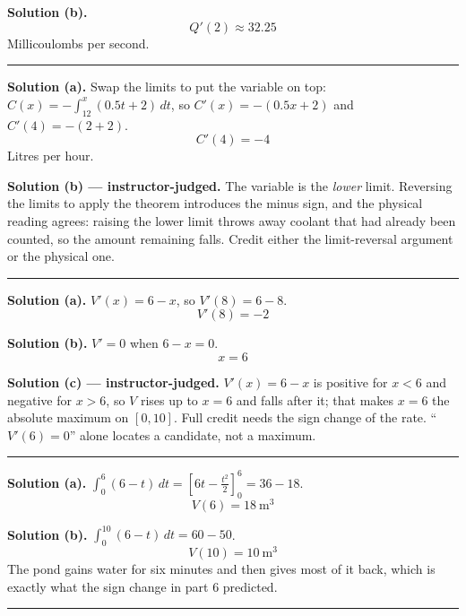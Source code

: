 \documentclass[12pt]{article}
\begin{document}
\textbf{Solution (b).}
\[ \boxed{Q'(2) \approx 32.25} \]
Millicoulombs per second.

\vspace{0.15cm}\noindent\rule{\linewidth}{0.2pt}


\textbf{Solution (a).} Swap the limits to put the variable on top:
$C(x) = -\int_{12}^{x}(0.5t + 2)\,dt$, so $C'(x) = -(0.5x + 2)$ and
$C'(4) = -(2 + 2)$.
\[ \boxed{C'(4) = -4} \]
Litres per hour.

\textbf{Solution (b) --- instructor-judged.} The variable is the \emph{lower}
limit. Reversing the limits to apply the theorem introduces the minus sign, and
the physical reading agrees: raising the lower limit throws away coolant that
had already been counted, so the amount remaining falls. Credit either the
limit-reversal argument or the physical one.

\vspace{0.15cm}\noindent\rule{\linewidth}{0.2pt}


\textbf{Solution (a).} $V'(x) = 6 - x$, so $V'(8) = 6 - 8$.
\[ \boxed{V'(8) = -2} \]

\textbf{Solution (b).} $V' = 0$ when $6 - x = 0$.
\[ \boxed{x = 6} \]

\textbf{Solution (c) --- instructor-judged.} $V'(x) = 6 - x$ is positive for
$x < 6$ and negative for $x > 6$, so $V$ rises up to $x = 6$ and falls after it;
that makes $x = 6$ the absolute maximum on $[0, 10]$. Full credit needs the sign
change of the rate. ``$V'(6) = 0$'' alone locates a candidate, not a maximum.

\vspace{0.15cm}\noindent\rule{\linewidth}{0.2pt}


\textbf{Solution (a).} $\int_0^6 (6 - t)\,dt = \left[6t - \tfrac{t^2}{2}\right]_0^6
= 36 - 18$.
\[ \boxed{V(6) = 18\ \text{m}^3} \]

\textbf{Solution (b).} $\int_0^{10}(6 - t)\,dt = 60 - 50$.
\[ \boxed{V(10) = 10\ \text{m}^3} \]
The pond gains water for six minutes and then gives most of it back, which is
exactly what the sign change in part 6 predicted.

\vspace{0.15cm}\noindent\rule{\linewidth}{0.2pt}
\end{document}
